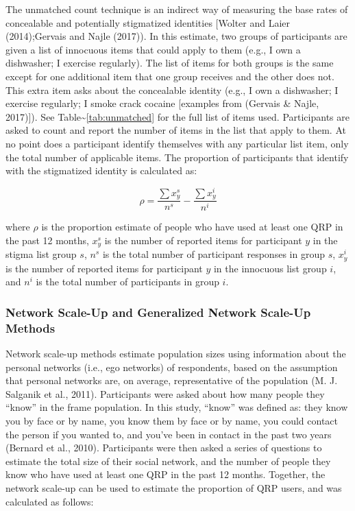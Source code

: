 \documentclass[,jou]{apa6}
\theoremstyle{definition}
\theoremstyle{definition}
\theoremstyle{definition}
\theoremstyle{remark}
\begin{document}
The unmatched count technique is an indirect way of measuring the base
rates of concealable and potentially stigmatized identities {[}Wolter
and Laier (2014);Gervais and Najle (2017)). In this estimate, two groups
of participants are given a list of innocuous items that could apply to
them (e.g., I own a dishwasher; I exercise regularly). The list of items
for both groups is the same except for one additional item that one
group receives and the other does not. This extra item asks about the
concealable identity (e.g., I own a dishwasher; I exercise regularly; I
smoke crack cocaine {[}examples from (Gervais \& Najle, 2017){]}). See
Table\textasciitilde{}\ref{tab:unmatched} for the full list of items
used. Participants are asked to count and report the number of items in
the list that apply to them. At no point does a participant identify
themselves with any particular list item, only the total number of
applicable items. The proportion of participants that identify with the
stigmatized identity is calculated as:

\begin{equation}
\rho = \frac{\sum x_y^s}{n^s} - \frac{\sum x_y^i}{n^i}
\end{equation}

where \(\rho\) is the proportion estimate of people who have used at
least one QRP in the past 12 months, \(x_y^s\) is the number of reported
items for participant \(y\) in the stigma list group \(s\), \(n^s\) is
the total number of participant responses in group \(s\), \(x_y^i\) is
the number of reported items for participant \(y\) in the innocuous list
group \(i\), and \(n^i\) is the total number of participants in group
\(i\).

\subsubsection{Network Scale-Up and Generalized Network Scale-Up
Methods}\label{network-scale-up-and-generalized-network-scale-up-methods}

Network scale-up methods estimate population sizes using information
about the personal networks (i.e., ego networks) of respondents, based
on the assumption that personal networks are, on average, representative
of the population (M. J. Salganik et al., 2011). Participants were asked
about how many people they \enquote{know} in the frame population. In
this study, \enquote{know} was defined as: they know you by face or by
name, you know them by face or by name, you could contact the person if
you wanted to, and you've been in contact in the past two years (Bernard
et al., 2010). Participants were then asked a series of questions to
estimate the total size of their social network, and the number of
people they know who have used at least one QRP in the past 12 months.
Together, the network scale-up can be used to estimate the proportion of
QRP users, and was calculated as follows:
\end{document}
